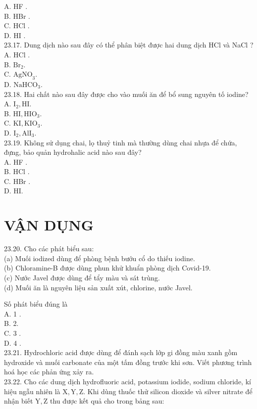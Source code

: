 \documentclass[10pt]{article}
\begin{document}
A. HF .\\
B. HBr .\\
C. HCl .\\
D. HI .\\
23.17. Dung dịch nào sau đây có thể phân biệt được hai dung dịch HCl và NaCl ?\\
A. HCl .\\
B. $\mathrm{Br}_{2}$.\\
C. $\mathrm{AgNO}_{3}$.\\
D. $\mathrm{NaHCO}_{3}$.\\
23.18. Hai chất nào sau đây được cho vào muối ăn để bổ sung nguyên tố iodine?\\
A. $\mathrm{I}_{2}, \mathrm{HI}$.\\
B. $\mathrm{HI}, \mathrm{HIO}_{3}$.\\
C. $\mathrm{KI}, \mathrm{KIO}_{3}$.\\
D. $\mathrm{I}_{2}, \mathrm{AlI}_{3}$.\\
23.19. Không sử dụng chai, lọ thuỷ tinh mà thường dùng chai nhựa để chứa, đựng, bảo quản hydrohalic acid nào sau đây?\\
A. HF .\\
B. HCl .\\
C. HBr .\\
D. HI.

\section*{VẬN DỤNG}
23.20. Cho các phát biểu sau:\\
(a) Muối iodized dùng để phòng bệnh bướu cổ do thiếu iodine.\\
(b) Chloramine-B được dùng phun khử khuẩn phòng dịch Covid-19.\\
(c) Nước Javel được dùng để tẩy màu và sát trùng.\\
(d) Muối ăn là nguyên liệu sản xuất xút, chlorine, nước Javel.

Số phát biểu đúng là\\
A. 1 .\\
B. 2.\\
C. 3 .\\
D. 4 .\\
23.21. Hydrochloric acid được dùng để đánh sạch lớp gi đồng màu xanh gồm hydroxide và muối carbonate của một tấm đồng trước khi sơn. Viết phương trình hoá học các phản ứng xảy ra.\\
23.22. Cho các dung dịch hydrofluoric acid, potassium iodide, sodium chloride, kí hiệu ngẫu nhiên là $\mathrm{X}, \mathrm{Y}, \mathrm{Z}$. Khi dùng thuốc thử silicon dioxide và silver nitrate để nhận biết $\mathrm{Y}, \mathrm{Z}$ thu được kết quả cho trong bảng sau:
\end{document}

